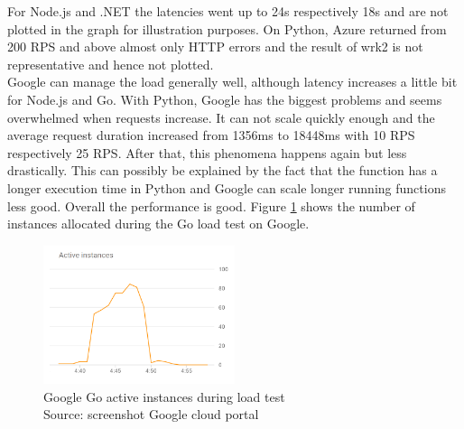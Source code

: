 For Node.js and .NET the latencies went up to 24s respectively 18s and are not plotted in the graph for illustration purposes. On Python, Azure returned from 200 \gls{RPS} and above almost only \gls{HTTP} errors and the result of wrk2 is not representative and hence not plotted.\\
Google can manage the load generally well, although latency increases a little bit for Node.js and Go. With Python, Google has the biggest problems and seems overwhelmed when requests increase. It can not scale quickly enough and the average request duration increased from 1356ms to 18448ms with 10 \gls{RPS} respectively 25 \gls{RPS}. After that, this phenomena happens again but less drastically. This can possibly be explained by the fact that the function has a longer execution time in Python and Google can scale longer running functions less good. Overall the performance is good. Figure \ref{fig:google_graph_go} shows the number of instances allocated during the Go load test on Google.

\begin{figure}[htp]
\begin{center}
\includegraphics[width=0.5\textwidth]{bilder/Google_Go_Instances.png}
\captionsetup{justification=centering, labelfont=bf}
\caption[Google Go active instances during load test]{Google Go active instances during load test\\Source: screenshot Google cloud portal}
\label{fig:google_graph_go}
\end{center}
\end{figure}

